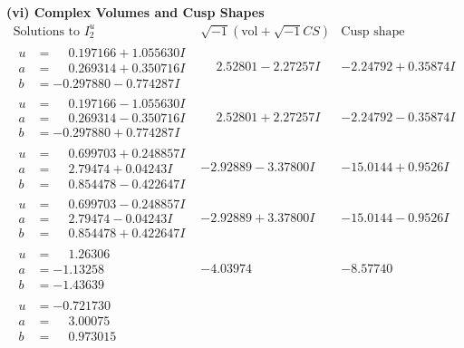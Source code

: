 \documentclass[1p]{elsarticle_modified}
\theoremstyle{definition}
\newcommand{\I}{\sqrt{-1}}
\begin{document}
\newpage\flushleft \textbf{(vi) Complex Volumes and Cusp Shapes}
$$\begin{array}{c|c|c}  
\text{Solutions to }I^u_{2}& \I (\text{vol} + \sqrt{-1}CS) & \text{Cusp shape}\\
 \hline 
\begin{aligned}
u &= \phantom{-}0.197166 + 1.055630 I \\
a &= \phantom{-}0.269314 + 0.350716 I \\
b &= -0.297880 - 0.774287 I\end{aligned}
 & \phantom{-}2.52801 - 2.27257 I & -2.24792 + 0.35874 I \\ \hline\begin{aligned}
u &= \phantom{-}0.197166 - 1.055630 I \\
a &= \phantom{-}0.269314 - 0.350716 I \\
b &= -0.297880 + 0.774287 I\end{aligned}
 & \phantom{-}2.52801 + 2.27257 I & -2.24792 - 0.35874 I \\ \hline\begin{aligned}
u &= \phantom{-}0.699703 + 0.248857 I \\
a &= \phantom{-}2.79474 + 0.04243 I \\
b &= \phantom{-}0.854478 - 0.422647 I\end{aligned}
 & -2.92889 - 3.37800 I & -15.0144 + 0.9526 I \\ \hline\begin{aligned}
u &= \phantom{-}0.699703 - 0.248857 I \\
a &= \phantom{-}2.79474 - 0.04243 I \\
b &= \phantom{-}0.854478 + 0.422647 I\end{aligned}
 & -2.92889 + 3.37800 I & -15.0144 - 0.9526 I \\ \hline\begin{aligned}
u &= \phantom{-}1.26306\phantom{ +0.000000I} \\
a &= -1.13258\phantom{ +0.000000I} \\
b &= -1.43639\phantom{ +0.000000I}\end{aligned}
 & -4.03974\phantom{ +0.000000I} & -8.57740\phantom{ +0.000000I} \\ \hline\begin{aligned}
u &= -0.721730\phantom{ +0.000000I} \\
a &= \phantom{-}3.00075\phantom{ +0.000000I} \\
b &= \phantom{-}0.973015\phantom{ +0.000000I}\end{aligned}

\end{array}$$
\end{document}
